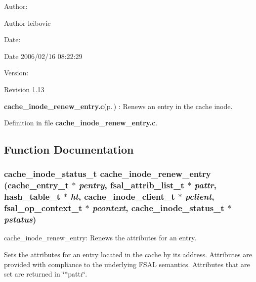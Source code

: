 \begin{Desc}
\item[Author:]\begin{Desc}
\item[Author]leibovic \end{Desc}
\end{Desc}
\begin{Desc}
\item[Date:]\begin{Desc}
\item[Date]2006/02/16 08:22:29 \end{Desc}
\end{Desc}
\begin{Desc}
\item[Version:]\begin{Desc}
\item[Revision]1.13 \end{Desc}
\end{Desc}
{\bf cache\_\-inode\_\-renew\_\-entry.c}{\rm (p.\,\pageref{cache__inode__renew__entry_8c})} : Renews an entry in the cache inode.

Definition in file {\bf cache\_\-inode\_\-renew\_\-entry.c}.

\subsection{Function Documentation}
\subsubsection{\setlength{\rightskip}{0pt plus 5cm}cache\_\-inode\_\-status\_\-t cache\_\-inode\_\-renew\_\-entry (cache\_\-entry\_\-t $\ast$ {\em pentry}, fsal\_\-attrib\_\-list\_\-t $\ast$ {\em pattr}, hash\_\-table\_\-t $\ast$ {\em ht}, cache\_\-inode\_\-client\_\-t $\ast$ {\em pclient}, fsal\_\-op\_\-context\_\-t $\ast$ {\em pcontext}, cache\_\-inode\_\-status\_\-t $\ast$ {\em pstatus})}\label{cache__inode__renew__entry_8c_a0}


cache\_\-inode\_\-renew\_\-entry: Renews the attributes for an entry.

Sets the attributes for an entry located in the cache by its address. Attributes are provided with compliance to the underlying FSAL semantics. Attributes that are set are returned in \char`\"{}$\ast$pattr\char`\"{}.

